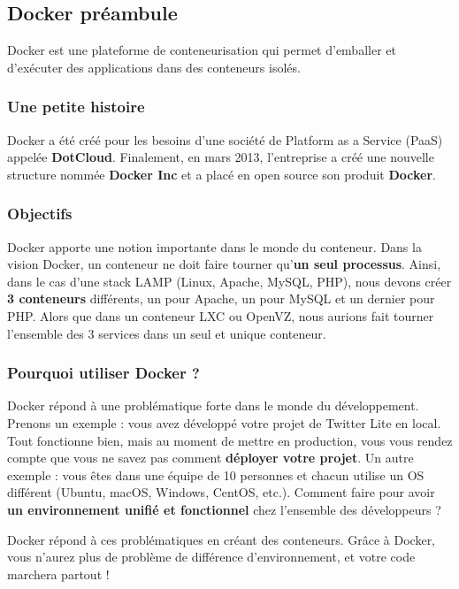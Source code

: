 \documentclass[12pt,a4paper]{article}
\begin{document}
\subsection{Docker préambule}
Docker est une plateforme de conteneurisation qui permet d'emballer et d'exécuter des applications dans des conteneurs isolés.
\subsubsection{Une petite histoire}
Docker a été créé pour les besoins d'une société de Platform as a Service (PaaS) appelée \textbf{DotCloud}. Finalement, en mars 2013, l'entreprise a créé une nouvelle structure nommée \textbf{Docker Inc} et a placé en open source son produit \textbf{Docker}.

\subsubsection{Objectifs}
Docker apporte une notion importante dans le monde du conteneur. Dans la vision Docker, un conteneur ne doit faire tourner qu'\textbf{un seul processus}. Ainsi, dans le cas d'une stack LAMP (Linux, Apache, MySQL, PHP), nous devons créer \textbf{3 conteneurs} différents, un pour Apache, un pour MySQL et un dernier pour PHP. Alors que dans un conteneur LXC ou OpenVZ, nous aurions fait tourner l'ensemble des 3 services dans un seul et unique conteneur.

\subsubsection{Pourquoi utiliser Docker ?}
Docker répond à une problématique forte dans le monde du développement.
Prenons un exemple : vous avez développé votre projet de Twitter Lite en local. Tout fonctionne bien, mais au moment de mettre en production, vous vous rendez compte que vous ne savez pas comment \textbf{déployer votre projet}. Un autre exemple : vous êtes dans une équipe de 10 personnes et chacun utilise un OS différent (Ubuntu, macOS, Windows, CentOS, etc.). Comment faire pour avoir \textbf{un environnement unifié et fonctionnel} chez l'ensemble des développeurs ?

Docker répond à ces problématiques en créant des conteneurs. Grâce à Docker, vous n'aurez plus de problème de différence d'environnement, et votre code marchera partout !
\end{document}
